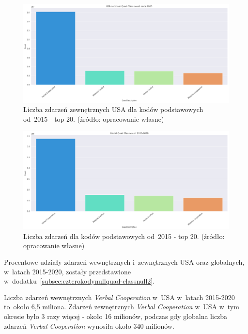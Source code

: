 \documentclass[11pt]{report}
\begin{document}
    \begin{figure}[tp]
        \centering
        \includegraphics[width=\linewidth]{fig/USA not inner/QC.png}
        \caption{Liczba zdarzeń zewnętrznych USA dla kodów podstawowych od~2015 - top 20. (źródło: opracowanie własne)}
        \label{fig:USA_not_inner_QC}
    \end{figure}


    \begin{figure}[tp]
        \centering
        \includegraphics[width=\linewidth]{fig/GLOBAL//QC.png}
        \caption{Liczba zdarzeń dla kodów podstawowych od~2015 - top 20. (źródło: opracowanie własne)}
        \label{fig:GLOBAL_QC}
    \end{figure}

    Procentowe udziały zdarzeń wewnętrznych i~zewnętrznych USA oraz globalnych, w~latach 2015-2020, zostały przedstawione
    w~dodatku~\ref{subsec:czterokodynullquad-classnull2}.

    Liczba zdarzeń wewnętrznych \textit{Verbal Cooperation} w~USA w~latach 2015-2020 to~około 6,5 miliona.
    Zdarzeń zewnętrznych \textit{Verbal Cooperation} w~USA w~tym okresie było 3 razy więcej - około 16 milionów,
    podczas gdy globalna liczba zdarzeń \textit{Verbal Cooperation} wynosiła około 340 milionów.
\end{document}
